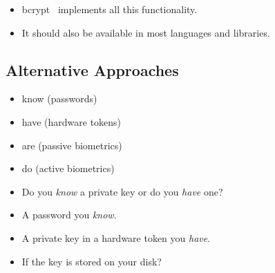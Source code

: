 \begin{frame}
  \begin{example}
    \begin{itemize}
      \item bcrypt~\cite{bcrypt} implements all this functionality.
      \item It should also be available in most languages and libraries.
    \end{itemize}
  \end{example}
\end{frame}

\subsection{Alternative Approaches}

\begin{frame}
  \begin{example}
    \begin{itemize}
      \item know (passwords)
      \item have (hardware tokens)
      \item are (passive biometrics)
      \item do (active biometrics)
    \end{itemize}
  \end{example}

  \pause{}

  \begin{remark}
    \begin{itemize}
      \item Do you \emph{know} a private key or do you \emph{have} one?
      \item A password you \emph{know}.
      \item A private key in a hardware token you \emph{have}.
      \item If the key is stored on your disk?
    \end{itemize}
  \end{remark}
\end{frame}

